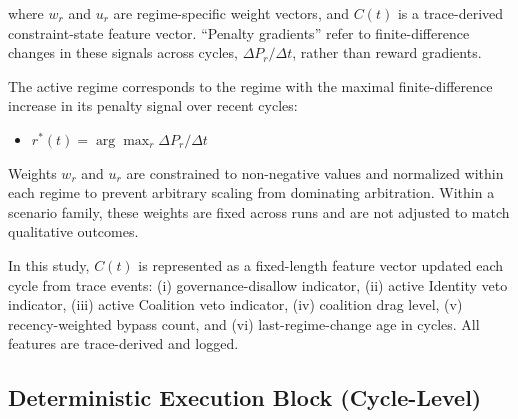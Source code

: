 \documentclass[11pt,a4paper]{article}
\begin{document}
where $w_r$ and $u_r$ are regime-specific weight vectors, and $C(t)$ is a trace-derived constraint-state feature vector. ``Penalty gradients'' refer to finite-difference changes in these signals across cycles, $\Delta P_r/\Delta t$, rather than reward gradients.

The active regime corresponds to the regime with the maximal finite-difference increase in its penalty signal over recent cycles:

\begin{itemize}
    \item $r^*(t) = \arg\max_r \Delta P_r/\Delta t$
\end{itemize}

Weights $w_r$ and $u_r$ are constrained to non-negative values and normalized within each regime to prevent arbitrary scaling from dominating arbitration. Within a scenario family, these weights are fixed across runs and are not adjusted to match qualitative outcomes.

In this study, $C(t)$ is represented as a fixed-length feature vector updated each cycle from trace events: (i) governance-disallow indicator, (ii) active Identity veto indicator, (iii) active Coalition veto indicator, (iv) coalition drag level, (v) recency-weighted bypass count, and (vi) last-regime-change age in cycles. All features are trace-derived and logged.

\subsection{Deterministic Execution Block (Cycle-Level)}
\end{document}
